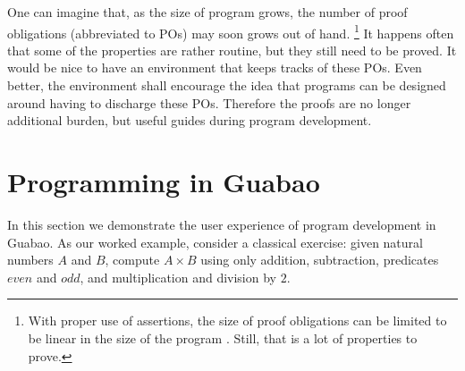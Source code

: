 \documentclass[runningheads]{llncs}
\newcommand{\Conid}[1]{\mathit{#1}}
\newcommand{\Varid}[1]{\mathit{#1}}
\let\Varid\mathit
\let\Conid\mathit
\begin{document}
One can imagine that, as the size of program grows, the number of proof obligations (abbreviated to POs) may soon grows out of hand.
\footnote{With proper use of assertions, the size of proof obligations can be limited to be linear in the size of the program \cite{Dijkstra:69:Understanding}. Still, that is a lot of properties to prove.}
It happens often that some of the properties are rather routine, but they still need to be proved.
It would be nice to have an environment that keeps tracks of these POs.
Even better, the environment shall encourage the idea that programs can be designed around having to discharge these POs.
Therefore the proofs are no longer additional burden, but useful guides during program development.

\section{Programming in Guabao}
\label{sec:programming-example}

In this section we demonstrate the user experience of program development in Guabao.
As our worked example, consider a classical exercise: given natural numbers \ensuremath{\Conid{A}} and \ensuremath{\Conid{B}},
compute \ensuremath{\Conid{A}\times\Conid{B}} using only addition, subtraction, predicates \ensuremath{\Varid{even}} and \ensuremath{\Varid{odd}}, and multiplication and division by \ensuremath{\mathrm{2}}.
\end{document}
